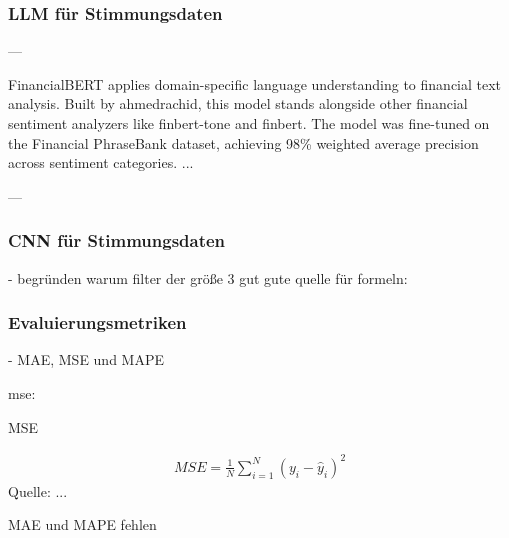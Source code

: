 \subsubsection{LLM für Stimmungsdaten}\label{sec:theorie_llm}
---

FinancialBERT applies domain-specific language understanding to financial text analysis. Built by ahmedrachid, this model stands alongside other financial sentiment analyzers like finbert-tone and finbert. The model was fine-tuned on the Financial PhraseBank dataset, achieving 98\% weighted average precision across sentiment categories.
...

---
\autocite{hazourli2022financialbert}


\subsubsection{CNN für Stimmungsdaten}\label{sec:theorie_cnn}

- begründen warum filter der größe 3 gut
gute quelle für formeln: \autocite{guan2020stockprice}

\subsubsection{Evaluierungsmetriken}\label{sec:theorie_evalmetrics}

- \ac{MAE}, \ac{MSE} und \ac{MAPE}  
\autocite[Kap. 4.3]{xie2024deep}

mse:

\begin{formel}[h]
	\caption{\ac{MSE}}
	\label{frm:mse}
	\begin{align}
		MSE = \frac{1}{N} \sum_{i=1}^{N} (y_i - \hat{y}_i)^2
	\end{align}
	\vspace{0.5em}
	\normalsize{Quelle: ...}
	\vspace{-1.0em}
\end{formel}

MAE und MAPE fehlen






